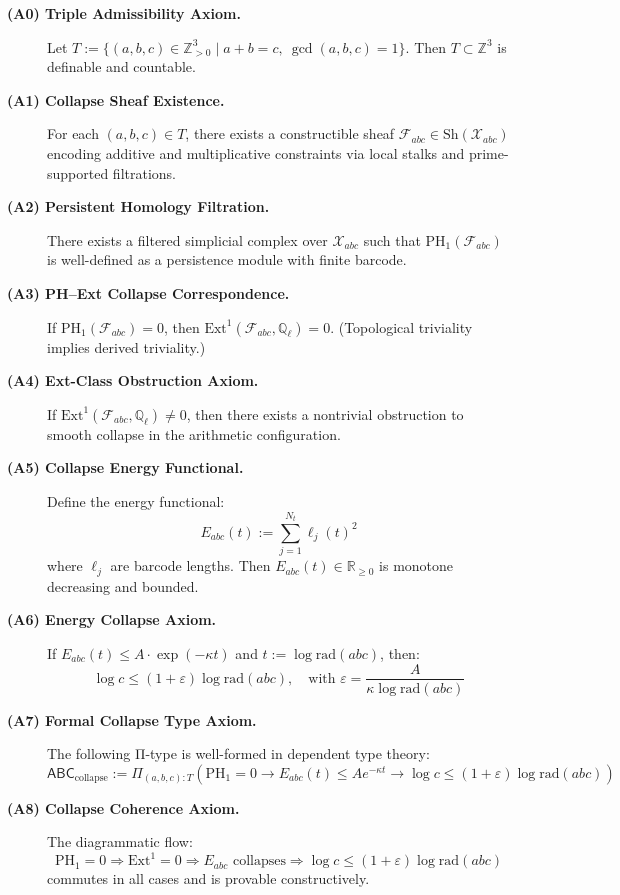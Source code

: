 \documentclass[11pt]{article}
\begin{document}
\begin{description}
  \item[\textbf{(A0) Triple Admissibility Axiom.}]  
  Let \( T := \{ (a,b,c) \in \mathbb{Z}_{>0}^3 \mid a + b = c,\ \gcd(a,b,c)=1 \} \).  
  Then \( T \subset \mathbb{Z}^3 \) is definable and countable.

  \item[\textbf{(A1) Collapse Sheaf Existence.}]  
  For each \( (a,b,c) \in T \), there exists a constructible sheaf \( \mathcal{F}_{abc} \in \mathrm{Sh}(\mathcal{X}_{abc}) \)  
  encoding additive and multiplicative constraints via local stalks and prime-supported filtrations.

  \item[\textbf{(A2) Persistent Homology Filtration.}]  
  There exists a filtered simplicial complex over \( \mathcal{X}_{abc} \) such that  
  \( \mathrm{PH}_1(\mathcal{F}_{abc}) \) is well-defined as a persistence module with finite barcode.

  \item[\textbf{(A3) PH–Ext Collapse Correspondence.}]  
  If \( \mathrm{PH}_1(\mathcal{F}_{abc}) = 0 \), then \( \mathrm{Ext}^1(\mathcal{F}_{abc}, \mathbb{Q}_\ell) = 0 \).  
  (Topological triviality implies derived triviality.)

  \item[\textbf{(A4) Ext-Class Obstruction Axiom.}]  
  If \( \mathrm{Ext}^1(\mathcal{F}_{abc}, \mathbb{Q}_\ell) \neq 0 \), then  
  there exists a nontrivial obstruction to smooth collapse in the arithmetic configuration.

  \item[\textbf{(A5) Collapse Energy Functional.}]  
  Define the energy functional:
  \[
  E_{abc}(t) := \sum_{j=1}^{N_t} \ell_j(t)^2
  \]
  where \( \ell_j \) are barcode lengths. Then \( E_{abc}(t) \in \mathbb{R}_{\geq 0} \) is monotone decreasing and bounded.

  \item[\textbf{(A6) Energy Collapse Axiom.}]  
  If \( E_{abc}(t) \leq A \cdot \exp(-\kappa t) \) and \( t := \log \mathrm{rad}(abc) \), then:
  \[
  \log c \leq (1 + \varepsilon) \log \mathrm{rad}(abc), \quad \text{with } \varepsilon = \frac{A}{\kappa \log \mathrm{rad}(abc)}
  \]

  \item[\textbf{(A7) Formal Collapse Type Axiom.}]  
  The following Π-type is well-formed in dependent type theory:
  \[
  \mathsf{ABC}_{\text{collapse}} := \Pi_{(a,b,c):T} \left( \mathrm{PH}_1 = 0 \to E_{abc}(t) \leq A e^{-\kappa t} \to \log c \leq (1+\varepsilon) \log \mathrm{rad}(abc) \right)
  \]

  \item[\textbf{(A8) Collapse Coherence Axiom.}]  
  The diagrammatic flow:
  \[
  \mathrm{PH}_1 = 0 \Rightarrow \mathrm{Ext}^1 = 0 \Rightarrow E_{abc} \text{ collapses} \Rightarrow \log c \leq (1+\varepsilon) \log \mathrm{rad}(abc)
  \]
  commutes in all cases and is provable constructively.
\end{description}
\end{document}

